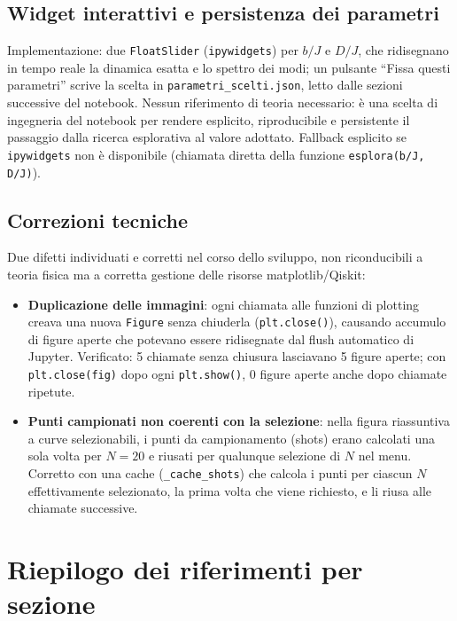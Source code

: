 \documentclass[11pt,a4paper]{article}
\begin{document}
\subsection{Widget interattivi e persistenza dei parametri}

Implementazione: due \texttt{FloatSlider} (\texttt{ipywidgets}) per $b/J$ e
$D/J$, che ridisegnano in tempo reale la dinamica esatta e lo spettro dei
modi; un pulsante ``Fissa questi parametri'' scrive la scelta in
\texttt{parametri\_scelti.json}, letto dalle sezioni successive del
notebook. Nessun riferimento di teoria necessario: è una scelta di
ingegneria del notebook per rendere esplicito, riproducibile e persistente
il passaggio dalla ricerca esplorativa al valore adottato. Fallback esplicito
se \texttt{ipywidgets} non è disponibile (chiamata diretta della funzione
\texttt{esplora(b/J, D/J)}).

\subsection{Correzioni tecniche}

Due difetti individuati e corretti nel corso dello sviluppo, non
riconducibili a teoria fisica ma a corretta gestione delle risorse
matplotlib/Qiskit:
\begin{itemize}
\item \textbf{Duplicazione delle immagini}: ogni chiamata alle funzioni di
plotting creava una nuova \texttt{Figure} senza chiuderla
(\texttt{plt.close()}), causando accumulo di figure aperte che potevano
essere ridisegnate dal flush automatico di Jupyter. Verificato: 5 chiamate
senza chiusura lasciavano 5 figure aperte; con \texttt{plt.close(fig)} dopo
ogni \texttt{plt.show()}, 0 figure aperte anche dopo chiamate ripetute.
\item \textbf{Punti campionati non coerenti con la selezione}: nella figura
riassuntiva a curve selezionabili, i punti da campionamento (shots) erano
calcolati una sola volta per $N=20$ e riusati per qualunque selezione di
$N$ nel menu. Corretto con una cache (\texttt{\_cache\_shots}) che calcola i
punti per ciascun $N$ effettivamente selezionato, la prima volta che viene
richiesto, e li riusa alle chiamate successive.
\end{itemize}

\section{Riepilogo dei riferimenti per sezione}
\end{document}
